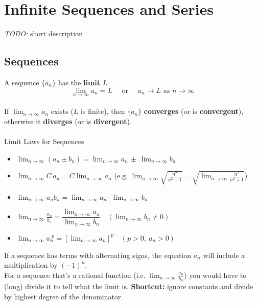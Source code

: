 \documentclass[8pt,letterpaper]{article}
\begin{document}
\section{Infinite Sequences and Series} %
\emph{TODO:} short description

\subsection*{Sequences} %
A sequence $\{a_n\}$ has the \textbf{limit} $L$
\begin{equation*}
\lim_{n \to \infty} a_n = L \quad \mbox{ or } \quad a_n \to L \mbox{ as } n \to \infty
\end{equation*}
\\
If $\lim_{n \to \infty} a_n$ exists ($L$ is finite), then
$\{a_n\}$ \textbf{converges} (or is \textbf{convergent}), otherwise
it \textbf{diverges} (or is \textbf{divergent}).
\\
\\
Limit Laws for Sequences %
\begin{itemize}
\item $\lim_{n \to \infty} (a_n \pm b_n) = \lim_{n \to \infty} a_n \, \pm \, \lim_{n \to \infty} b_n$
\item $\lim_{n \to \infty} C\,a_n= C \lim_{n \to \infty} a_n$
(e.g. $\lim_{n \to \infty} \sqrt{\frac{n^2}{n^2 + 1}} = \sqrt{ \lim_{n \to \infty} \frac{n^2}{n^2 + 1}}$)
\item $\lim_{n \to \infty} a_n b_n = \lim_{n \to \infty} a_n \cdot \lim_{n \to \infty} b_n$
\item $\lim_{n \to \infty} \frac{a_n}{b_n} = \dfrac{\lim_{n \to \infty} a_n}{\lim_{n \to \infty} b_n}
\quad(\lim_{n \to \infty} b_n \neq 0)$
\item $\lim_{n \to \infty} a_n^{\;p}= [\lim_{n \to \infty} a_n]^p
\quad(p > 0,\: a_n > 0)$
\end{itemize}


\noindent If a sequence has terms with alternating signs, the equation $a_n$ will include
a multiplication by $(-1)^n$.\\

\noindent For a sequence that's a rational function (i.e. $ \lim_{n \to \infty} \frac{a_n}{b_n}$)
you would have to (long) divide it to tell what the limit is.
\textbf{Shortcut:} ignore constants and divide by highest degree of the denominator.
\end{document}
